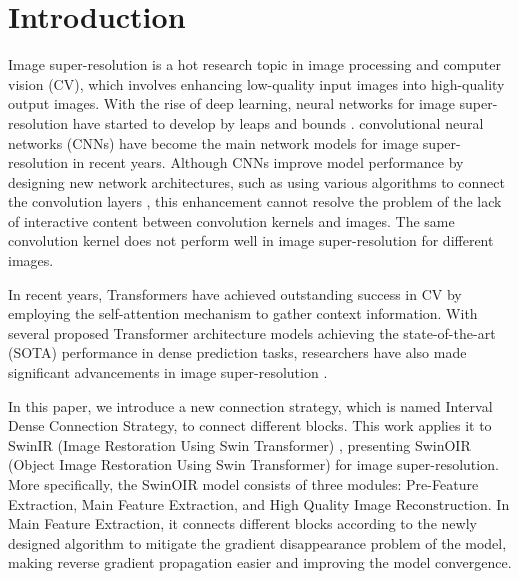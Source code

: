 \documentclass[default,iicol]{sn-jnl}
\theoremstyle{thmstyleone}\newtheorem{theorem}{Theorem}\newtheorem{proposition}[theorem]{Proposition}
\theoremstyle{thmstyletwo}\newtheorem{example}{Example}\newtheorem{remark}{Remark}\theoremstyle{thmstylethree}\newtheorem{definition}{Definition}
\begin{document}
\maketitle

\section{Introduction}
Image super-resolution is a hot research topic in image processing and computer vision (CV), which involves enhancing low-quality input images into high-quality output images. With the rise of deep learning, neural networks for image super-resolution have started to develop by leaps and bounds \cite{dong2015image}\cite{yue2016image}\cite{wang2020deep}. convolutional neural networks (CNNs) \cite{yang2019deep}\cite{tian2020coarse}\cite{tian2020lightweight}\cite{tian2022heterogeneous}\cite{tian2022image}\cite{tian2022image} have become the main network models for image super-resolution in recent years. Although CNNs improve model performance by designing new network architectures, such as using various algorithms to connect the convolution layers \cite{ju2022threshnet}\cite{ju2023efficient}, this enhancement cannot resolve the problem of the lack of interactive content between convolution kernels and images. The same convolution kernel does not perform well in image super-resolution for different images.

In recent years, Transformers \cite{vaswani2017attention}\cite{han2021transformer} have achieved outstanding success in CV by employing the self-attention mechanism to gather context information. With several proposed Transformer architecture models \cite{yao2023dual}\cite{wang2022pvt}\cite{zhang2023vitaev2} achieving the state-of-the-art (SOTA) performance in dense prediction tasks, researchers have also made significant advancements in image super-resolution \cite{liang2022light}\cite{lei2021transformer}\cite{gao2023ctcnet}\cite{liu2022interactformer}.

In this paper, we introduce a new connection strategy, which is named Interval Dense Connection Strategy, to connect different blocks. This work applies it to SwinIR (Image Restoration Using Swin Transformer) \cite{liang2021swinir}, presenting SwinOIR (Object Image Restoration Using Swin Transformer) for image super-resolution. More specifically, the SwinOIR model consists of three modules: Pre-Feature Extraction, Main Feature Extraction, and High Quality Image Reconstruction. In Main Feature Extraction, it connects different blocks according to the newly designed algorithm to mitigate the gradient disappearance problem of the model, making reverse gradient propagation easier and improving the model convergence.
\end{document}
